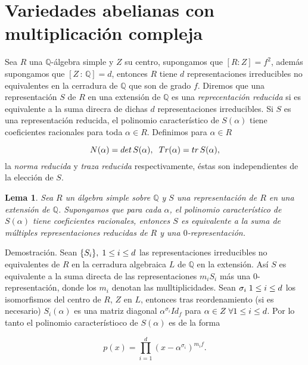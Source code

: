 \documentclass[letterpaper]{report}
\newtheorem{lema}[teorema]{Lema}
\newcommand{\dem}{{\sc Demostraci\'on. }}
\newcommand{\rac}{\ensuremath{ \mathbb Q }}
\begin{document}
\section{Variedades abelianas con multiplicación compleja}

Sea $R$ una $\rac$-álgebra simple y $Z$ su centro, supongamos que $[R:Z]=f^2$, además supongamos que $[Z\,:\,\rac]=d$, entonces $R$ tiene $d$ representaciones irreducibles no equivalentes en la cerradura de $\rac$ que son de grado $f$. Diremos que una representación $S$ de $R$ en una extensión de $\rac$ es una \textit{reprecentación reducida} si es equivalente a la suma direcra de dichas $d$ representaciones irreducibles. Si $S$ es una representación reducida, el polinomio característico de $S(\alpha)$ tiene coeficientes racionales para toda $\alpha\in R$. Definimos para $\alpha\in R$

\begin{equation}
	N(\alpha)=det\,S(\alpha),\hspace{0.2cm}Tr(\alpha)=tr\,S(\alpha),
\end{equation}
\noindent la \textit{norma reducida} y \textit{traza reducida} respectivamente, éstas son independientes de la elección de $S$.
\begin{lema}\label{lema1}
Sea $R$ un álgebra simple sobre $\rac$ y $S$ una representación de $R$ en una extensión de $\rac$. Supongamos que para cada $\alpha$, el polinomio característico de $S(\alpha)$ tiene coeficientes racionales, entonces $S$ es equivalente a la suma de múltiples representaciones reducidas de $R$ y una $0$-representación.
\end{lema}
\dem Sean $\lbrace S_i\rbrace,\hspace{0.1cm}1\leq i\leq d$ las representaciones irreducibles no equivalentes de $R$ en la cerradura algebraica $L$ de $\rac$ en la extensión. Así  $S$ es equivalente a la suma directa de las representaciones $m_i S_i$ más una $0$- representación, donde los $m_i$ denotan las mulltiplicidades. Sean $\sigma_i\hspace{0.1cm}1\leq i\leq d$ los isomorfismos del centro de $R$, $Z$ en $L$, entonces tras reordenamiento (si es necesario) $S_i(\alpha)$ es una matriz diagonal $\alpha^{\sigma_i}Id_{f}$ para $\alpha\in Z\hspace{0.1cm}\forall1\leq i\leq d$. Por lo tanto el polinomio característioco de $S(\alpha )$ es de la forma

$$p(x)=\prod_{i=1}^d(x-\alpha^{\sigma_i})^{m_if}.$$
\end{document}
